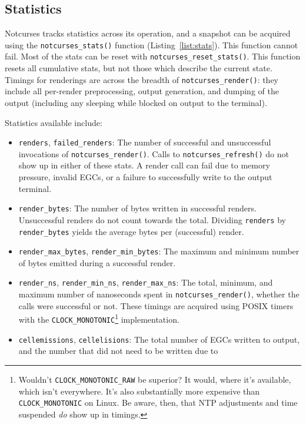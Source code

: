 \documentclass[letterpaper,10pt]{article}
\newenvironment{denseitemize}{
  \begin{itemize}
      \setlength{\itemsep}{0pt}
}{
  \end{itemize}
}
\begin{document}
\subsection{Statistics}
Notcurses tracks statistics across its operation, and a snapshot can be
acquired using the \texttt{notcurses\_stats()} function (Listing~\ref{list:stats}). This function cannot
fail. Most of the stats can be reset with \texttt{notcurses\_reset\_stats()}.
This function resets all cumulative stats, but not those which describe the
current state. Timings for renderings are across the breadth of
\texttt{notcurses\_render()}: they include all per-render preprocessing, output
generation, and dumping of the output (including any sleeping while blocked on
output to the terminal).

Statistics available include:
\begin{denseitemize}
\item{\texttt{renders}, \texttt{failed\_renders}: The number of successful and unsuccessful
    invocations of \texttt{notcurses\_render()}. Calls to \texttt{notcurses\_refresh()} do
    not show up in either of these stats. A render call can fail due to
    memory pressure, invalid EGCs, or a failure to successfully write to the
    output terminal.}
\item{\texttt{render\_bytes}: The number of bytes written in successful renders.
    Unsuccessful renders do not count towards the total. Dividing \texttt{renders}
  by \texttt{render\_bytes} yields the average bytes per (successful) render.}
\item{\texttt{render\_max\_bytes}, \texttt{render\_min\_bytes}: The maximum and
  minimum number of bytes emitted during a successful render.}
\item{\texttt{render\_ns}, \texttt{render\_min\_ns}, \texttt{render\_max\_ns}:
  The total, minimum, and maximum number of nanoseconds spent in \texttt{notcurses\_render()},
  whether the calls were successful or not. These timings are acquired using
  POSIX timers\cite{clockgettime} with the
  \texttt{CLOCK\_MONOTONIC}\footnote{Wouldn't \texttt{CLOCK\_MONOTONIC\_RAW} be
  superior? It would, where it's available, which isn't everywhere. It's also
  substantially more expensive than \texttt{CLOCK\_MONOTONIC} on Linux. Be
  aware, then, that NTP adjustments and time suspended \textit{do} show up in
  timings.} implementation.}
\item{\texttt{cellemissions}, \texttt{cellelisions}: The total number of EGCs
  written to output, and the number that did not need to be written due to
}
\end{denseitemize}
\end{document}
